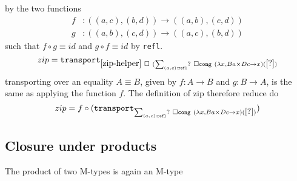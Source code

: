 \documentclass[twoside,11pt,openright]{report}
\begin{document}
by the two functions
\begin{align}
  f &: ((a , c) , (b , d)) \rightarrow ((a , b) , (c , d)) \\
  g &: ((a , b) , (c , d)) \rightarrow ((a , c) , (b , d))
\end{align}
such that \(f \circ g \equiv id\) and \(g \circ f \equiv id\) by \texttt{refl}. 
\begin{equation}
  zip = \mathtt{transport}_{\eqref{zip-helper}~\square~(\sum_{(a , c) : \mathtt{refl}} ?~\square \mathtt{cong}~(\lambda x, Ba \times D c \rightarrow x) (\eqref{?})}
\end{equation}
transporting over an equality \(A \equiv B\), given by \(f : A \rightarrow B\) and \(g : B \rightarrow A\), is the same as applying the function \(f\). The definition of zip therefore reduce do
\begin{equation}
  zip = f \circ (\mathtt{transport}_{\sum_{(a , c) : \mathtt{refl}} ?~\square \mathtt{cong}~(\lambda x, Ba \times D c \rightarrow x) (\eqref{?})})
\end{equation}

\subsection{Closure under products}
The product of two M-types is again an M-type
\end{document}
